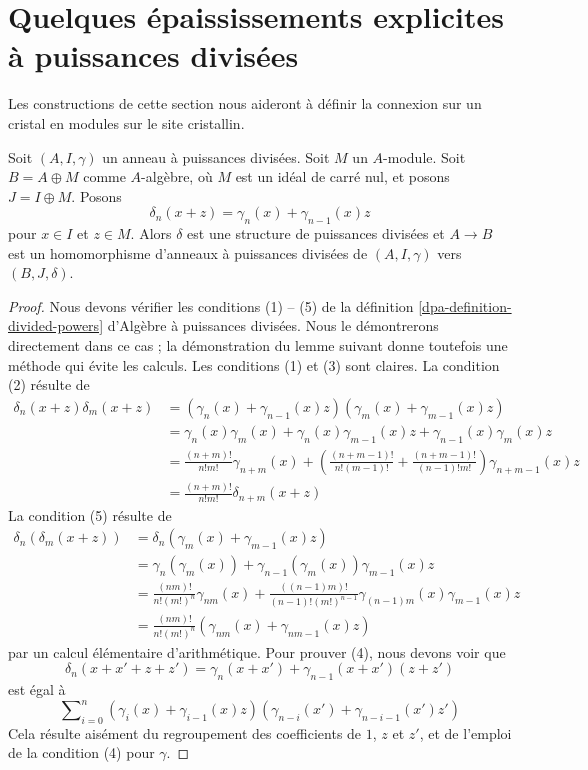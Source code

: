 \section{Quelques épaississements explicites à puissances divisées}
\label{section-explicit-thickenings}

\noindent
Les constructions de cette section nous aideront à définir la connexion
sur un cristal en modules sur le site cristallin.

\begin{lemma}
\label{lemma-divided-power-first-order-thickening}
Soit $(A, I, \gamma)$ un anneau à puissances divisées. Soit $M$ un $A$-module.
Soit $B = A \oplus M$ comme $A$-algèbre, où $M$ est un idéal de carré nul,
et posons $J = I \oplus M$. Posons
$$
\delta_n(x + z) = \gamma_n(x) + \gamma_{n - 1}(x)z
$$
pour $x \in I$ et $z \in M$.
Alors $\delta$ est une structure de puissances divisées et
$A \to B$ est un homomorphisme d'anneaux à puissances divisées de
$(A, I, \gamma)$ vers $(B, J, \delta)$.
\end{lemma}

\begin{proof}
Nous devons vérifier les conditions (1) -- (5) de la
définition \ref{dpa-definition-divided-powers} d'Algèbre à puissances divisées.
Nous le démontrerons directement dans ce cas ; la démonstration du
lemme suivant donne toutefois une méthode qui évite les calculs.
Les conditions (1) et (3) sont claires. La condition (2) résulte de
\begin{align*}
\delta_n(x + z)\delta_m(x + z)
& =
(\gamma_n(x) + \gamma_{n - 1}(x)z)(\gamma_m(x) + \gamma_{m - 1}(x)z) \\
& = \gamma_n(x)\gamma_m(x) + \gamma_n(x)\gamma_{m - 1}(x)z +
\gamma_{n - 1}(x)\gamma_m(x)z \\
& =
\frac{(n + m)!}{n!m!} \gamma_{n + m}(x) +
\left(\frac{(n + m - 1)!}{n!(m - 1)!} +
\frac{(n + m - 1)!}{(n - 1)!m!}\right)
\gamma_{n + m - 1}(x) z \\
& =
\frac{(n + m)!}{n!m!}\delta_{n + m}(x + z)
\end{align*}
La condition (5) résulte de
\begin{align*}
\delta_n(\delta_m(x + z))
& =
\delta_n(\gamma_m(x) + \gamma_{m - 1}(x)z) \\
& =
\gamma_n(\gamma_m(x)) + \gamma_{n - 1}(\gamma_m(x))\gamma_{m - 1}(x)z \\
& =
\frac{(nm)!}{n! (m!)^n} \gamma_{nm}(x) +
\frac{((n - 1)m)!}{(n - 1)! (m!)^{n - 1}}
\gamma_{(n - 1)m}(x) \gamma_{m - 1}(x) z \\
& = \frac{(nm)!}{n! (m!)^n}(\gamma_{nm}(x) + \gamma_{nm - 1}(x) z)
\end{align*}
par un calcul élémentaire d'arithmétique. Pour prouver (4), nous devons voir que
$$
\delta_n(x + x' + z + z')
=
\gamma_n(x + x') + \gamma_{n - 1}(x + x')(z + z')
$$
est égal à
$$
\sum\nolimits_{i = 0}^n
(\gamma_i(x) + \gamma_{i - 1}(x)z)
(\gamma_{n - i}(x') + \gamma_{n - i - 1}(x')z')
$$
Cela résulte aisément du regroupement des coefficients de
$1$, $z$ et $z'$, et de l'emploi de la condition (4) pour $\gamma$.
\end{proof}

